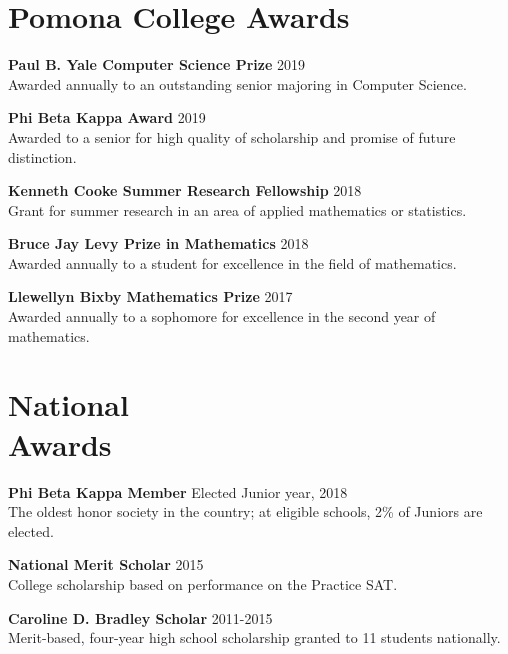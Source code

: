 \documentclass[margin]{res}
\begin{document}
\begin{resume}
\section{Pomona College Awards}

\textbf{Paul B. Yale Computer Science Prize} \hfill 2019\\
Awarded annually to an outstanding senior majoring in Computer Science.

\textbf{Phi Beta Kappa Award} \hfill 2019\\
Awarded to a senior for high quality of scholarship and promise of future distinction.

\textbf{Kenneth Cooke Summer Research Fellowship} \hfill 2018\\
Grant for summer research in an area of applied mathematics or statistics.

\textbf{Bruce Jay Levy Prize in Mathematics} \hfill 2018\\
Awarded annually to a student for excellence in the field of mathematics.

\textbf{Llewellyn Bixby Mathematics Prize} \hfill 2017\\
Awarded annually to a sophomore for excellence in the second year of mathematics.

\section{National \\Awards}
\textbf{Phi Beta Kappa Member} \hfill Elected Junior year, 2018\\
The oldest honor society in the country; at eligible schools, 2\% of Juniors are elected.

\textbf{National Merit Scholar} \hfill 2015\\
College scholarship based on performance on the Practice SAT.

\textbf{Caroline D. Bradley Scholar} \hfill 2011-2015\\
Merit-based, four-year high school scholarship granted to 11 students nationally.

\end{resume}
\end{document}
